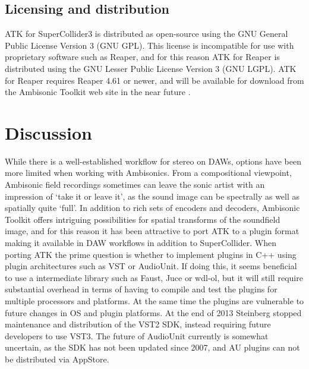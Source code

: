 \documentclass{article}
\begin{document}






\subsection{Licensing and distribution}\label{sec:license}

ATK for SuperCollider3 is distributed as open-source using the GNU General Public License Version 3 (GNU GPL). This license is incompatible for use with proprietary software such as Reaper, and for this reason ATK for Reaper is distributed using the GNU Lesser Public License Version 3 (GNU LGPL).
ATK for Reaper requires Reaper 4.61 or newer, and will be available for download from the Ambisonic Toolkit web site in the near future \cite{ambisonictoolkit.net:2014}.



\section{Discussion}\label{sec:discussion}

While there is a well-established workflow for stereo on DAWs, options have been more limited when working with Ambisonics.
From a compositional viewpoint, Ambisonic field recordings sometimes can leave the sonic artist with an impression of `take it or leave it', as the sound image can be spectrally as well as spatially quite `full'.
In addition to rich sets of encoders and decoders, Ambisonic Toolkit offers intriguing possibilities for spatial transforms of the soundfield image, and for this reason it has been attractive to port ATK to a plugin format making it available in DAW workflows in addition to SuperCollider.
When porting ATK the prime question is whether to implement plugins in C++ using plugin architectures such as VST or AudioUnit.
If doing this, it seems beneficial to use a intermediate library such as Faust, Juce or wdl-ol, but it will still require substantial overhead in terms of having to compile and test the plugins for multiple processors and platforms.
At the same time the plugins are vulnerable to future changes in OS and plugin platforms.
At the end of 2013 Steinberg stopped maintenance and distribution of the VST2 SDK, instead requiring future developers to use VST3. The future of AudioUnit currently is somewhat uncertain, as the SDK has not been updated since 2007, and AU plugins can not be distributed via AppStore.
\end{document}
